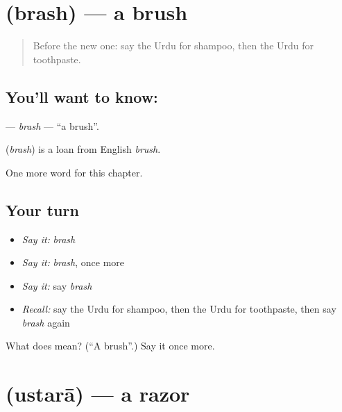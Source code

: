 \section[\texorpdfstring{\ur{برش} (brash)}{برش (brash)}]{ (brash) — a brush}

\label{lesson:UR-C197-brash}



\begin{quote}
Before the new one: say the Urdu for shampoo, then the Urdu for toothpaste.
\end{quote}

\subsection*{You'll want to know: }
\textbf{} — \emph{brash} — \textquotedblleft{}a brush\textquotedblright{}.

\begin{cousinweb}
\textbf{} (\emph{brash}) is a loan from English \emph{brush}.
\end{cousinweb}

\begin{grammarlens}[title={What you've built}]
One more word for this chapter.
\end{grammarlens}

\subsection*{Your turn}
\begin{itemize}
\raggedright
  \item \emph{Say it:} \emph{brash}
  \item \emph{Say it:} \emph{brash}, once more
  \item \emph{Say it:} say \emph{brash}
  \item \emph{Recall:} say the Urdu for shampoo, then the Urdu for toothpaste, then say \emph{brash} again
\end{itemize}

\begin{tcolorbox}[breakable,colback=teal!4,colframe=teal!35!black,title={Before you move on}]
What does  mean? (\textquotedblleft{}A brush\textquotedblright{}.) Say it once more.
\end{tcolorbox}
\section[\texorpdfstring{\ur{استرا} (ustarā)}{استرا (ustarā)}]{ (ustarā) — a razor}


